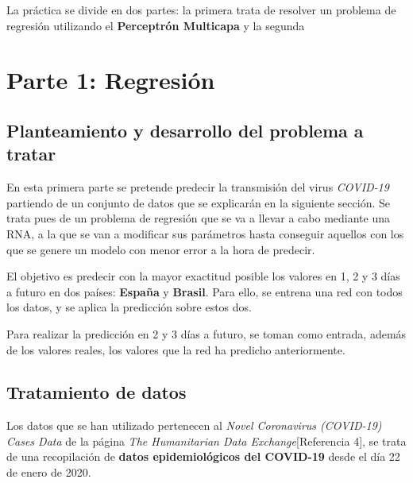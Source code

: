 \documentclass[12pt,a4paper, xcolor=table]{article}
\begin{document}
  \vspace{3mm}

   La práctica se divide en dos partes: la primera trata de resolver un problema de regresión utilizando el \textbf{Perceptrón Multicapa} y la segunda

\newpage


\section{Parte 1: Regresión}

    \subsection{Planteamiento y desarrollo del problema a tratar}

    En esta primera parte se pretende predecir la transmisión del virus \textit{COVID-19} partiendo de un conjunto de datos que se explicarán en la siguiente sección. Se trata pues de un problema de regresión que se va a llevar a cabo mediante una RNA, a la que se van a modificar sus parámetros hasta conseguir aquellos con los que se genere un modelo con menor error a la hora de predecir.

    \vspace{2mm}

    El objetivo es predecir con la mayor exactitud posible los valores en 1, 2 y 3 días a futuro en dos países: \textbf{España} y \textbf{Brasil}. Para ello, se entrena una red con todos los datos, y se aplica la predicción sobre estos dos.

    \vspace{2mm}

    Para realizar la predicción en 2 y 3 días a futuro, se toman como entrada, además de los valores reales, los valores que la red ha predicho anteriormente.




    \subsection{Tratamiento de datos}

    Los datos que se han utilizado pertenecen al \textit{Novel Coronavirus (COVID-19) Cases Data} de la página \textit{The Humanitarian Data Exchange}[Referencia 4], se trata de una recopilación de \textbf{datos epidemiológicos del COVID-19} desde el día 22 de enero de 2020.

    \vspace{3mm}
\end{document}
